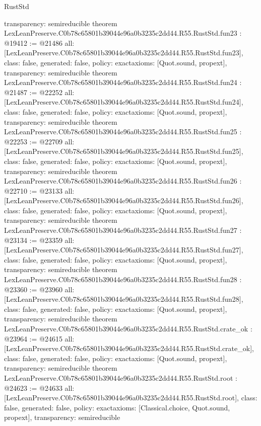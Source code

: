 \begin{lexlean}{RustStd}
\begin{coremodule}
{  transparency: semireducible
}
theorem LexLeanPreserve.C0b78c65801b39044e96a0b3235c2dd44.R55.RustStd.fun23 : @19412 := @21486 {
  all: [LexLeanPreserve.C0b78c65801b39044e96a0b3235c2dd44.R55.RustStd.fun23],
  class: false,
  generated: false,
  policy: exact{axioms: [Quot.sound, propext]},
  transparency: semireducible
}
theorem LexLeanPreserve.C0b78c65801b39044e96a0b3235c2dd44.R55.RustStd.fun24 : @21487 := @22252 {
  all: [LexLeanPreserve.C0b78c65801b39044e96a0b3235c2dd44.R55.RustStd.fun24],
  class: false,
  generated: false,
  policy: exact{axioms: [Quot.sound, propext]},
  transparency: semireducible
}
theorem LexLeanPreserve.C0b78c65801b39044e96a0b3235c2dd44.R55.RustStd.fun25 : @22253 := @22709 {
  all: [LexLeanPreserve.C0b78c65801b39044e96a0b3235c2dd44.R55.RustStd.fun25],
  class: false,
  generated: false,
  policy: exact{axioms: [Quot.sound, propext]},
  transparency: semireducible
}
theorem LexLeanPreserve.C0b78c65801b39044e96a0b3235c2dd44.R55.RustStd.fun26 : @22710 := @23133 {
  all: [LexLeanPreserve.C0b78c65801b39044e96a0b3235c2dd44.R55.RustStd.fun26],
  class: false,
  generated: false,
  policy: exact{axioms: [Quot.sound, propext]},
  transparency: semireducible
}
theorem LexLeanPreserve.C0b78c65801b39044e96a0b3235c2dd44.R55.RustStd.fun27 : @23134 := @23359 {
  all: [LexLeanPreserve.C0b78c65801b39044e96a0b3235c2dd44.R55.RustStd.fun27],
  class: false,
  generated: false,
  policy: exact{axioms: [Quot.sound, propext]},
  transparency: semireducible
}
theorem LexLeanPreserve.C0b78c65801b39044e96a0b3235c2dd44.R55.RustStd.fun28 : @23360 := @23960 {
  all: [LexLeanPreserve.C0b78c65801b39044e96a0b3235c2dd44.R55.RustStd.fun28],
  class: false,
  generated: false,
  policy: exact{axioms: [Quot.sound, propext]},
  transparency: semireducible
}
theorem LexLeanPreserve.C0b78c65801b39044e96a0b3235c2dd44.R55.RustStd.crate_ok : @23964 := @24615 {
  all: [LexLeanPreserve.C0b78c65801b39044e96a0b3235c2dd44.R55.RustStd.crate_ok],
  class: false,
  generated: false,
  policy: exact{axioms: [Quot.sound, propext]},
  transparency: semireducible
}
theorem LexLeanPreserve.C0b78c65801b39044e96a0b3235c2dd44.R55.RustStd.root : @24623 := @24633 {
  all: [LexLeanPreserve.C0b78c65801b39044e96a0b3235c2dd44.R55.RustStd.root],
  class: false,
  generated: false,
  policy: exact{axioms: [Classical.choice, Quot.sound, propext]},
  transparency: semireducible
}


\end{coremodule}
\end{lexlean}
